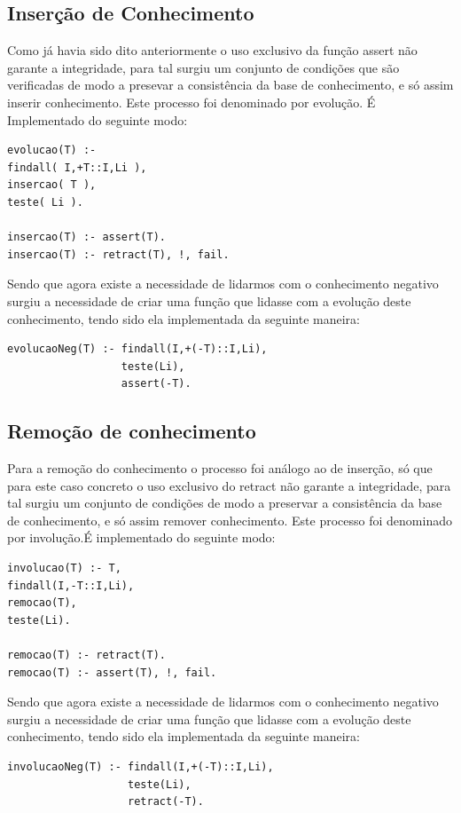 \documentclass[25pt]{article}
\begin{document}
\subsection{Inserção de Conhecimento}
Como já havia sido dito anteriormente o uso exclusivo da função assert não garante a integridade, para tal surgiu um conjunto de condições que são
verificadas de modo a presevar a consistência da base de conhecimento, e só assim inserir conhecimento. Este processo foi denominado por evolução.
É Implementado do seguinte modo:
\begin{lstlisting}
evolucao(T) :-
findall( I,+T::I,Li ),
insercao( T ),
teste( Li ).

insercao(T) :- assert(T).
insercao(T) :- retract(T), !, fail.
\end{lstlisting}

Sendo que agora existe a necessidade de lidarmos com o conhecimento negativo surgiu a necessidade de criar uma função que lidasse
com a evolução deste conhecimento, tendo sido ela implementada da seguinte maneira:
\begin{lstlisting}
evolucaoNeg(T) :- findall(I,+(-T)::I,Li),
                  teste(Li),
                  assert(-T).
\end{lstlisting}

\subsection{Remoção de conhecimento}

Para a remoção do conhecimento o processo foi análogo ao de inserção, só que para este caso concreto o uso exclusivo do retract não garante a integridade, para tal surgiu um conjunto de condições de modo a preservar a consistência da base de conhecimento, e só assim remover conhecimento.
Este processo foi denominado por involução.É implementado do seguinte modo:

\begin{lstlisting}
involucao(T) :- T,
findall(I,-T::I,Li),
remocao(T),
teste(Li).

remocao(T) :- retract(T).
remocao(T) :- assert(T), !, fail.
\end{lstlisting}

Sendo que agora existe a necessidade de lidarmos com o conhecimento negativo surgiu a necessidade de criar uma função que lidasse
com a evolução deste conhecimento, tendo sido ela implementada da seguinte maneira:

\begin{lstlisting}
involucaoNeg(T) :- findall(I,+(-T)::I,Li),
                   teste(Li),
                   retract(-T).   
\end{lstlisting}
\end{document}
